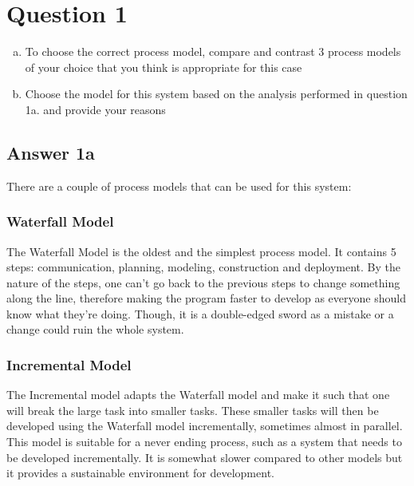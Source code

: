 \documentclass[
  11pt, %
]{assignment}
\begin{document}
\pagebreak

\section*{Question 1}

\begin{problem}
\begin{enumerate}[a.]
  \item To choose the correct process model, compare and contrast 3 process models of your choice that you think is appropriate for this case
  \item Choose the model for this system based on the analysis performed in question 1a. and provide your reasons
\end{enumerate}
\end{problem}

\subsection*{Answer 1a}

There are a couple of process models that can be used for this system:

\subsubsection*{Waterfall Model}

The Waterfall Model is the oldest and the simplest process model. It contains 5 steps: communication, planning, modeling, construction and deployment. By the nature of the steps, one can't go back to the previous steps to change something along the line, therefore making the program faster to develop as everyone should know what they're doing. Though, it is a double-edged sword as a mistake or a change could ruin the whole system.

\subsubsection*{Incremental Model}

The Incremental model adapts the Waterfall model and make it such that one will break the large task into smaller tasks. These smaller tasks will then be developed using the Waterfall model incrementally, sometimes almost in parallel. This model is suitable for a never ending process, such as a system that needs to be developed incrementally. It is somewhat slower compared to other models but it provides a sustainable environment for development.
\end{document}
